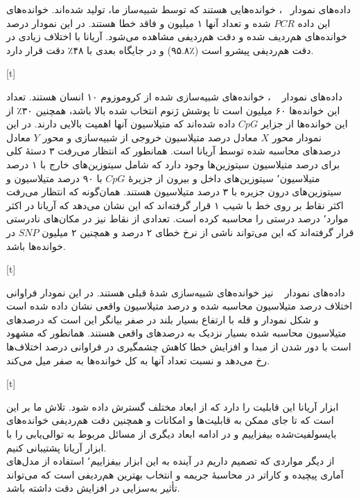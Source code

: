 
داده‌های نمودار ~، خوانده‌هایی هستند که توسط شبیه‌ساز ما، تولید شده‌اند. خوانده‌های این داده $PCR$ شده و تعداد آنها ۱ میلیون و فاقد خطا هستند. در این نمودار درصد خوانده‌های هم‌ردیف شده و دقت هم‌ردیفی مشاهده می‌شود. آریانا با اختلاف زیادی در دقت هم‌ردیفی پیشرو است (٪۹۵.۸) و  در جایگاه بعدی   با ۴۸٪ دقت قرار دارد.


[t]



داده‌های نمودار ~ ، خوانده‌های شبیه‌سازی شده از کروموزوم ۱۰ انسان هستند. تعداد این خوانده‌ها ۶۰ میلیون است تا پوشش ژنوم انتخاب شده بالا باشد، همچنین ۳۰٪ از این خوانده‌ها از جزایر $CpG$ داده شده‌اند که متیلاسیون آنها اهمیت بالایی دارند. در این نمودار محور $X$ معادل درصد متیلاسیون خروجی از شبیه‌سازی و محور $Y$ معادل درصدهای محاسبه شده توسط آریانا است. همانطور که انتظار می‌رفت ۳ دستهٔ کلی برای درصد متیلاسیون سیتوزین‌ها وجود دارد که شامل سیتوزین‌های خارج  با ۱ درصد متیلاسیون٬ سیتوزین‌های داخل  و بیرون از جزیرهٔ $CpG$ با ۹۰ درصد متیلاسیون و سیتوزین‌های درون جزیره با ۳ درصد متیلاسیون هستند. همان‌گونه که انتظار می‌رفت اکثر نقاط بر روی خط با شیب ۱ قرار گرفته‌اند که این نشان می‌دهد که آریانا در اکثر موارد٬ درصد درستی را محاسبه کرده است. تعدادی از نقاط نیز در مکان‌های نادرستی قرار گرفته‌اند که این می‌تواند ناشی از نرخ خطای ۲ درصد و همچنین ۲ میلیون $SNP$ در خوانده‌ها باشد.


[t]



داده‌های نمودار ~ نیز خوانده‌های شبیه‌سازی شدهٔ قبلی هستند. در این نمودار فراوانی اختلاف‌ درصد متیلاسیون محاسبه شده و درصد متیلاسیون واقعی نشان داده شده است و شکل نمودار و قله با ارتفاع بسیار بلند در صفر بیانگر این است که درصدهای متیلاسیون محاسبه شده بسیار نزدیک به درصدهای واقعی هستند. همانطور که مشهود است با دور شدن از مبدا و افزایش خطا کاهش چشمگیری در فراوانی درصد اختلاف‌ها رخ می‌دهد و نسبت تعداد آنها به کل خوانده‌ها به صفر میل می‌کند.

[t]



ابزار آریانا این قابلیت را دارد که از ابعاد مختلف گسترش داده شود. تلاش ما بر این است که تا جای ممکن به قابلیت‌ها و امکانات و همچنین دقت هم‌ردیفی خوانده‌های بایسولفیت‌شده بیفزاییم و در ادامه ابعاد دیگری از مسائل مربوط به توالی‌یابی را با ابزار آریانا پشتیبانی کنیم.\\
از دیگر مواردی که تصمیم داریم در آینده به این ابزار بیفزاییم٬ استفاده از مدل‌های آماری پیچیده و کاراتر در محاسبهٔ جریمه و انتخاب بهترین هم‌ردیفی است که می‌تواند تأثیر به‌سزایی در افزایش دقت داشته باشد.